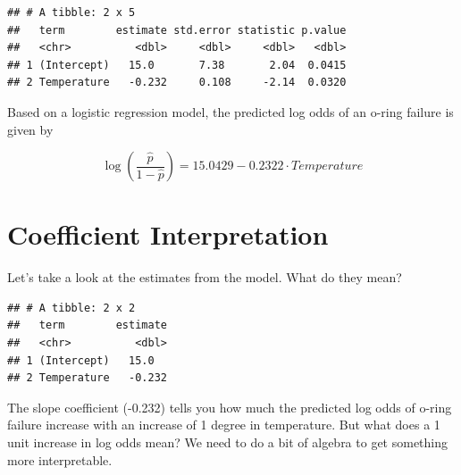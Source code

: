 \documentclass[
]{book}
\newenvironment{Shaded}{\begin{snugshade}}{\end{snugshade}}
\newcommand{\KeywordTok}[1]{\textcolor[rgb]{0.13,0.29,0.53}{\textbf{#1}}}
\newcommand{\NormalTok}[1]{#1}
\newcommand{\OperatorTok}[1]{\textcolor[rgb]{0.81,0.36,0.00}{\textbf{#1}}}
\newcommand{\StringTok}[1]{\textcolor[rgb]{0.31,0.60,0.02}{#1}}
\begin{document}
\begin{verbatim}
## # A tibble: 2 x 5
##   term        estimate std.error statistic p.value
##   <chr>          <dbl>     <dbl>     <dbl>   <dbl>
## 1 (Intercept)   15.0       7.38       2.04  0.0415
## 2 Temperature   -0.232     0.108     -2.14  0.0320
\end{verbatim}

Based on a logistic regression model, the predicted log odds of an o-ring failure is given by

\[\log\left(\frac{\hat{p}}{1-\hat{p}}\right) = 15.0429 -0.2322\cdot Temperature\]

\hypertarget{coefficient-interpretation}{%
\section{Coefficient Interpretation}\label{coefficient-interpretation}}

Let's take a look at the estimates from the model. What do they mean?

\begin{Shaded}
\end{Shaded}

\begin{verbatim}
## # A tibble: 2 x 2
##   term        estimate
##   <chr>          <dbl>
## 1 (Intercept)   15.0  
## 2 Temperature   -0.232
\end{verbatim}

The slope coefficient (-0.232) tells you how much the predicted log odds of o-ring failure increase with an increase of 1 degree in temperature. But what does a 1 unit increase in log odds mean? We need to do a bit of algebra to get something more interpretable.
\end{document}
